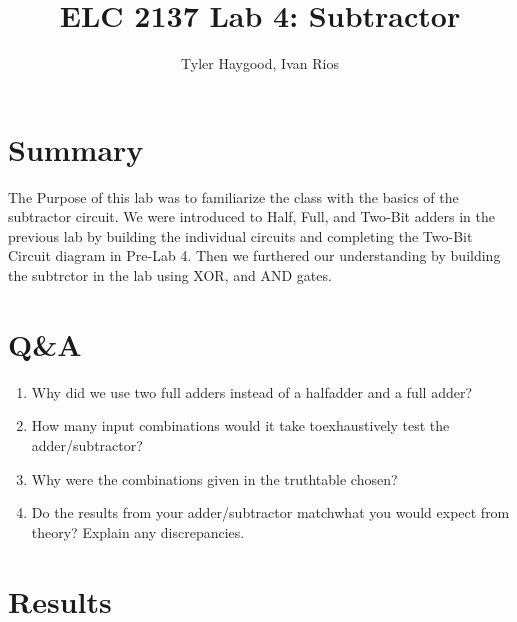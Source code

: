 \documentclass[]{report}
\begin{document}
	
	\title{ELC 2137 Lab 4: Subtractor}
	\author{Tyler Haygood, Ivan Rios}
	\maketitle
	
	\section*{Summary}
	The Purpose of this lab was to familiarize the class with the basics of the subtractor circuit.
	We were introduced to Half, Full, and Two-Bit adders in the previous lab by building the individual circuits
	and completing the Two-Bit Circuit diagram in Pre-Lab 4. Then we furthered our understanding by building the subtrctor in the lab
	using XOR, and AND gates.
	 
	
	 
	\section*{Q\&A}
	\begin{enumerate}
		\item Why did we use two full adders instead of a halfadder and a full adder? \newline
		
		\item How many input combinations would it take toexhaustively test the adder/subtractor? \newline
		
		\item Why  were  the  combinations  given  in  the  truthtable chosen? \newline
		
		\item Do the results from your adder/subtractor matchwhat  you  would  expect  from  theory? Explain any discrepancies. \newline
	
				
	\end{enumerate}
	
	\section*{Results}

	

	
	
	
	
\end{document}
